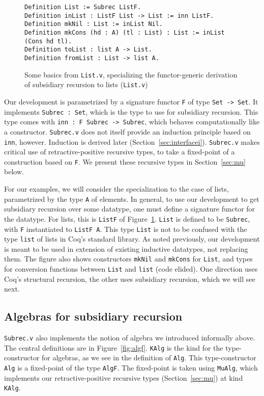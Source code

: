 \documentclass[a4paper,USenglish]{lipics-v2021}
\begin{document}
\begin{figure}
\begin{verbatim}
Definition List := Subrec ListF.
Definition inList : ListF List -> List := inn ListF.
Definition mkNil : List := inList Nil.
Definition mkCons (hd : A) (tl : List) : List := inList (Cons hd tl).
Definition toList : list A -> List.
Definition fromList : List -> list A.
\end{verbatim}
  \caption{Some basics from \texttt{List.v}, specializing the functor-generic derivation of subsidiary recursion to lists (\texttt{List.v})}
  \label{fig:listf}
\end{figure}

Our development is parametrized by a signature functor \verb|F| of
type \verb|Set -> Set|.  It implements \verb|Subrec : Set|, which is
the type to use for subsidiary recursion.  This type comes with
\verb|inn : F Subrec -> Subrec|, which behaves computationally like a
constructor.  \verb|Subrec.v| does not itself provide an induction
principle based on \verb|inn|, however.  Induction is derived later
(Section~\ref{sec:interfacei}). \verb|Subrec.v| makes critical use of
retractive-positive recursive types, to take a fixed-point of a
construction based on \verb|F|.  We present these recursive types in
Section~\ref{sec:mu} below.

For our examples, we will consider the specialization to the case of
lists, parametrized by the type \verb|A| of elements.  In general, to
use our development to get subsidiary recursion over some datatype,
one must define a signature functor for the datatype.  For lists, this
is \verb|ListF| of Figure~\ref{fig:listf}.  \verb|List| is defined to
be \verb|Subrec|, with \verb|F| instantiated to \verb|ListF A|.  This
type \verb|List| is not to be confused with the type \verb|list| of
lists in Coq's standard library.  As noted previously, our development
is meant to be used in extension of existing inductive datatypes, not
replacing them.  The figure also shows constructors \verb|mkNil| and
\verb|mkCons| for \verb|List|, and types for conversion functions
between \verb|List| and \verb|list| (code elided). One direction uses
Coq's structural recursion, the other uses subsidiary recursion, which
we will see next.
  

\subsection{Algebras for subsidiary recursion}

\verb|Subrec.v| also implements the notion of algebra we introduced
informally above.  The central definitions are in
Figure~\ref{fig:algf}.  \verb|KAlg| is the kind for the
type-constructor for algebras, as we see in the definition of
\verb|Alg|.  This type-constructor \verb|Alg| is a fixed-point of the
type \verb|AlgF|.  The fixed-point is taken using \verb|MuAlg|, which
implements our retractive-positive recursive types
(Section~\ref{sec:mu}) at kind \verb|KAlg|.  
\end{document}
